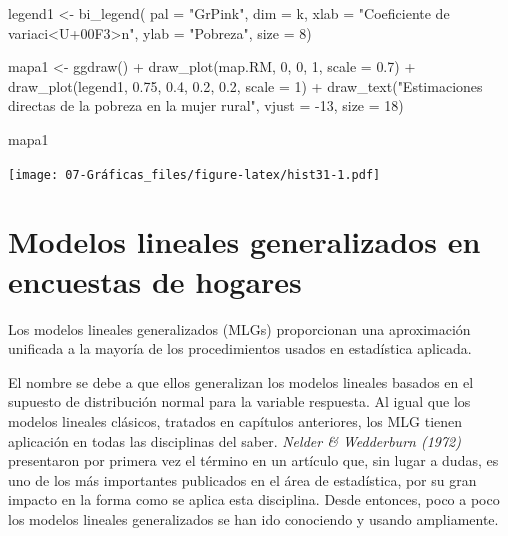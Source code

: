 \documentclass[
  12pt,
]{book}
\newenvironment{Shaded}{\begin{snugshade}}{\end{snugshade}}
\newcommand{\AttributeTok}[1]{\textcolor[rgb]{0.77,0.63,0.00}{#1}}
\newcommand{\DecValTok}[1]{\textcolor[rgb]{0.00,0.00,0.81}{#1}}
\newcommand{\FloatTok}[1]{\textcolor[rgb]{0.00,0.00,0.81}{#1}}
\newcommand{\FunctionTok}[1]{\textcolor[rgb]{0.00,0.00,0.00}{#1}}
\newcommand{\NormalTok}[1]{#1}
\newcommand{\OtherTok}[1]{\textcolor[rgb]{0.56,0.35,0.01}{#1}}
\newcommand{\SpecialCharTok}[1]{\textcolor[rgb]{0.00,0.00,0.00}{#1}}
\newcommand{\StringTok}[1]{\textcolor[rgb]{0.31,0.60,0.02}{#1}}
\begin{document}
\begin{Shaded}
\begin{Highlighting}[]
\NormalTok{legend1 }\OtherTok{\textless{}{-}} \FunctionTok{bi\_legend}\NormalTok{(}
  \AttributeTok{pal =} \StringTok{"GrPink"}\NormalTok{, }\AttributeTok{dim =}\NormalTok{ k,}
  \AttributeTok{xlab =} \StringTok{"Coeficiente de variaci\textless{}U+00F3\textgreater{}n"}\NormalTok{,}
  \AttributeTok{ylab =} \StringTok{"Pobreza"}\NormalTok{, }\AttributeTok{size =} \DecValTok{8}\NormalTok{)}

\NormalTok{mapa1 }\OtherTok{\textless{}{-}} \FunctionTok{ggdraw}\NormalTok{() }\SpecialCharTok{+}
  \FunctionTok{draw\_plot}\NormalTok{(map.RM, }\DecValTok{0}\NormalTok{, }\DecValTok{0}\NormalTok{, }\DecValTok{1}\NormalTok{, }\AttributeTok{scale =} \FloatTok{0.7}\NormalTok{) }\SpecialCharTok{+}
  \FunctionTok{draw\_plot}\NormalTok{(legend1, }\FloatTok{0.75}\NormalTok{, }\FloatTok{0.4}\NormalTok{, }\FloatTok{0.2}\NormalTok{, }\FloatTok{0.2}\NormalTok{, }\AttributeTok{scale =} \DecValTok{1}\NormalTok{) }\SpecialCharTok{+}
  \FunctionTok{draw\_text}\NormalTok{(}\StringTok{"Estimaciones directas de la pobreza en la mujer rural"}\NormalTok{,}
    \AttributeTok{vjust =} \SpecialCharTok{{-}}\DecValTok{13}\NormalTok{, }\AttributeTok{size =} \DecValTok{18}\NormalTok{)}

\NormalTok{mapa1}
\end{Highlighting}
\end{Shaded}

\texttt{[image: 07-Gráficas\_files/figure-latex/hist31-1.pdf]}

\hypertarget{modelos-lineales-generalizados-en-encuestas-de-hogares}{%
\chapter{Modelos lineales generalizados en encuestas de hogares}\label{modelos-lineales-generalizados-en-encuestas-de-hogares}}

Los modelos lineales generalizados (MLGs) proporcionan una aproximación unificada a la mayoría de los procedimientos usados en estadística aplicada.

El nombre se debe a que ellos generalizan los modelos lineales basados en el supuesto de distribución normal para la variable respuesta. Al igual que los modelos lineales clásicos, tratados en capítulos anteriores, los MLG tienen aplicación en todas las disciplinas del saber. \emph{Nelder \& Wedderburn (1972)} presentaron por primera vez el término en un artículo que, sin lugar a dudas, es uno de los más importantes publicados en el área de estadística, por su gran impacto en la forma como se aplica esta disciplina. Desde entonces, poco a
poco los modelos lineales generalizados se han ido conociendo y usando ampliamente.
\end{document}
